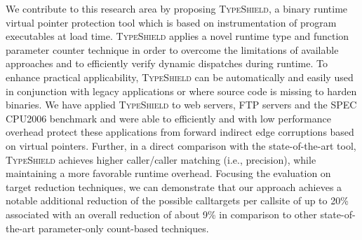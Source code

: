 We contribute to this research area by proposing \textsc{TypeShield}, a binary runtime virtual pointer protection tool 
which is based on instrumentation of program executables at load time. \textsc{TypeShield} applies a novel runtime 
type and function parameter counter technique in order to overcome the limitations of available approaches and to 
efficiently verify dynamic dispatches during runtime. To enhance practical applicability, \textsc{TypeShield} can 
be automatically and easily used in conjunction with legacy applications or where source code is missing to harden 
binaries.
We have applied \textsc{TypeShield} to web servers, FTP servers and the SPEC CPU2006 benchmark and were able to 
efficiently and with low performance overhead protect these applications from forward indirect edge corruptions 
based on virtual pointers. Further, in a direct comparison with the state-of-the-art tool, \textsc{TypeShield} 
achieves higher caller/caller matching (i.e., precision), while maintaining a more favorable runtime overhead. 
Focusing the evaluation on target reduction techniques, we can demonstrate that our approach achieves a notable 
additional reduction of the possible calltargets per callsite of up to 20\% associated with an overall reduction
of about 9\% in comparison to other state-of-the-art parameter-only count-based techniques.